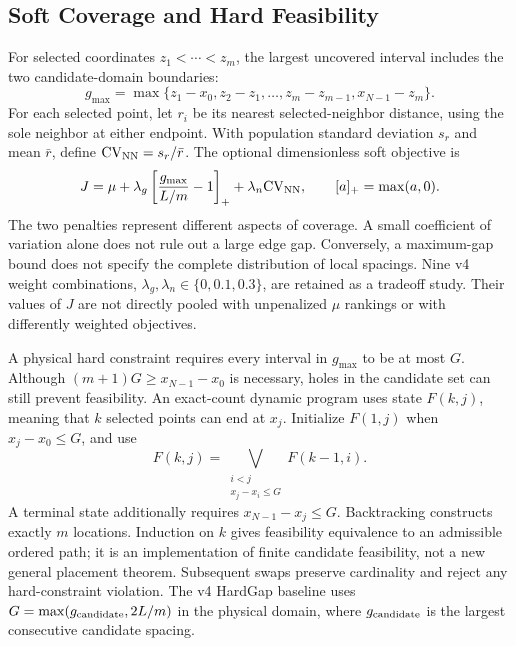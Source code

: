 \documentclass[journal]{IEEEtran}
\begin{document}
\subsection{Soft Coverage and Hard Feasibility}
For selected coordinates $z_1<\cdots<z_m$, the largest uncovered interval includes the two candidate-domain boundaries:
\begin{equation}
g_{\max}=\max\{z_1-x_0,z_2-z_1,\ldots,z_m-z_{m-1},x_{N-1}-z_m\}.
\end{equation}
For each selected point, let $r_i$ be its nearest selected-neighbor distance, using the sole neighbor at either endpoint. With population standard deviation $s_r$ and mean $\bar r$, define $\mathrm{CV}_{\rm NN}=s_r/\bar r$. The optional dimensionless soft objective is
\begin{equation}
J=\mu+\lambda_g\left[\frac{g_{\max}}{L/m}-1\right]_+
+\lambda_n\mathrm{CV}_{\rm NN},\qquad [a]_+=\max(a,0).
\label{eq:objective}
\end{equation}
The two penalties represent different aspects of coverage. A small coefficient of variation alone does not rule out a large edge gap. Conversely, a maximum-gap bound does not specify the complete distribution of local spacings. Nine v4 weight combinations, $\lambda_g,\lambda_n\in\{0,0.1,0.3\}$, are retained as a tradeoff study. Their values of $J$ are not directly pooled with unpenalized $\mu$ rankings or with differently weighted objectives.

A physical hard constraint requires every interval in $g_{\max}$ to be at most $G$. Although $(m+1)G\geq x_{N-1}-x_0$ is necessary, holes in the candidate set can still prevent feasibility. An exact-count dynamic program uses state $F(k,j)$, meaning that $k$ selected points can end at $x_j$. Initialize $F(1,j)$ when $x_j-x_0\leq G$, and use
\begin{equation}
F(k,j)=\bigvee_{\substack{i<j\\x_j-x_i\leq G}}F(k-1,i).
\end{equation}
A terminal state additionally requires $x_{N-1}-x_j\leq G$. Backtracking constructs exactly $m$ locations. Induction on $k$ gives feasibility equivalence to an admissible ordered path; it is an implementation of finite candidate feasibility, not a new general placement theorem. Subsequent swaps preserve cardinality and reject any hard-constraint violation. The v4 HardGap baseline uses $G=\max(g_{\rm candidate},2L/m)$ in the physical domain, where $g_{\rm candidate}$ is the largest consecutive candidate spacing.
\end{document}
